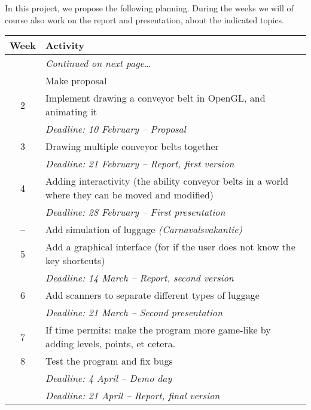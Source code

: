 In this project, we propose the following planning. During the weeks we will of course also work on the report and presentation, about the indicated topics.

\begin{longtabu} to 0.99
 \toprule
 \textbf{Week} & \textbf{Activity} \\
 \midrule
 \endhead
 \bottomrule
 & \vspace*{-5pt}\hfill\textit{Continued on next page\ldots} \\
 \endfoot
 \bottomrule
  & Make proposal \\
 2 & Implement drawing a conveyor belt in OpenGL, and animating it \\
   & \textit{Deadline: 10 February -- Proposal} \\
 3 & Drawing multiple conveyor belts together \\
   & \textit{Deadline: 21 February -- Report, first version} \\
 4 & Adding interactivity (the ability conveyor belts in a world where they can be moved and modified) \\
   & \textit{Deadline: 28 February -- First presentation} \\
-- & Add simulation of luggage \textit{(Carnavalsvakantie)} \\
 5 & Add a graphical interface (for if the user does not know the key shortcuts) \\
   & \textit{Deadline: 14 March -- Report, second version} \\
 6 & Add scanners to separate different types of luggage \\
   & \textit{Deadline: 21 March -- Second presentation} \\
 7 & If time permits: make the program more game-like by adding levels, points, et cetera. \\
 8 & Test the program and fix bugs \\
   & \textit{Deadline: 4 April -- Demo day} \\
   & \textit{Deadline: 21 April -- Report, final version} \\
\end{longtabu}

